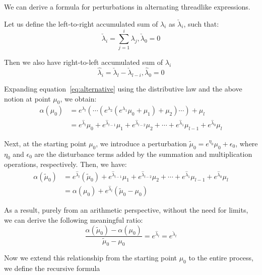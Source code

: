 We can derive a formula for perturbations in alternating threadlike expressions.

Let us define the left-to-right accumulated sum of $\lambda_i$ as $\check{\lambda}_i$, such that:
\begin{equation}
\check{\lambda}_i = \sum_{j=1}^i \lambda_j, \check{\lambda}_0 = 0\label{eq:accsumlr}
\end{equation}

Then we also have right-to-left accumulated sum of $\lambda_i$
\begin{equation}
\hat{\lambda}_i = \check{\lambda}_l - \check{\lambda}_{l - i}, \hat{\lambda}_0 = 0\label{eq:accsumrl}
\end{equation}

Expanding equation~\eqref{eq:alternative} using the distributive law and the above notion at point $\mu_0$, we obtain:
\begin{align}
\alpha(\mu_0) & = e^{\lambda_l}(\cdots (e^{\lambda_2} (e^{\lambda_1} \mu_0 + \mu_1) + \mu_2) \cdots) + \mu_l \\
& = e^{\hat{\lambda}_l} \mu_0 + e^{\hat{\lambda}_{l - 1}} \mu_1  + e^{\hat{\lambda}_{l - 2}} \mu_2 + \cdots + e^{\hat{\lambda}_1} \mu_{l - 1} + e^{\hat{\lambda}_0} \mu_l
\end{align}

Next, at the starting point $\mu_0$, we introduce a perturbation $\tilde{\mu}_0 = e^{\eta_0} \mu_0 + \epsilon_0$,
where $\eta_0$ and $\epsilon_0$ are the disturbance terms added by the summation and multiplication operations, respectively. Then, we have:
\begin{align}
\alpha(\tilde{\mu}_0) & = e^{\hat{\lambda}_l} (\tilde{\mu}_0) + e^{\hat{\lambda}_{l - 1}} \mu_1  + e^{\hat{\lambda}_{l - 2}} \mu_2 + \cdots + e^{\hat{\lambda}_1} \mu_{l - 1} + e^{\hat{\lambda}_0} \mu_l \\
& = \alpha(\mu_0) + e^{\hat{\lambda}_l} (\tilde{\mu}_0 - \mu_0)
\end{align}

As a result, purely from an arithmetic perspective, without the need for limits, we can derive the following meaningful ratio:
\begin{equation}
\frac{\alpha(\tilde{\mu}_0) - \alpha(\mu_0)}{\tilde{\mu}_0 - \mu_0} = e^{\hat{\lambda}_l} = e^{\check{\lambda}_l}\label{eq:ratio}
\end{equation}

Now we extend this relationship from the starting point $\mu_0$ to the entire process, we define the recursive formula

